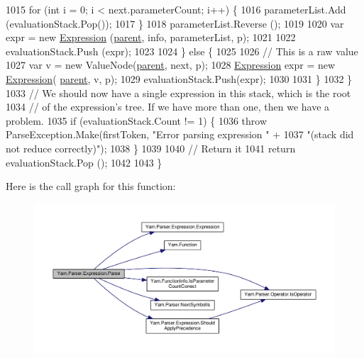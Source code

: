 \begin{DoxyCode}
1015                         \textcolor{keywordflow}{for} (\textcolor{keywordtype}{int} i = 0; i < next.parameterCount; i++) \{
1016                             parameterList.Add (evaluationStack.Pop());
1017                         \}
1018                         parameterList.Reverse ();
1019 
1020                         var expr = \textcolor{keyword}{new} \hyperlink{a00104_a17e5101d02b96d0071e7a0223e4daa3d}{Expression} (\hyperlink{a00148_af313a82103fcc2ff5a177dbb06b92f7b}{parent}, info, parameterList, p);
1021 
1022                         evaluationStack.Push (expr);
1023 
1024                     \} \textcolor{keywordflow}{else} \{
1025 
1026                         \textcolor{comment}{// This is a raw value}
1027                         var v = \textcolor{keyword}{new} ValueNode(\hyperlink{a00148_af313a82103fcc2ff5a177dbb06b92f7b}{parent}, next, p);
1028                         \hyperlink{a00104_a17e5101d02b96d0071e7a0223e4daa3d}{Expression} expr = \textcolor{keyword}{new} \hyperlink{a00104_a17e5101d02b96d0071e7a0223e4daa3d}{Expression}(
      \hyperlink{a00148_af313a82103fcc2ff5a177dbb06b92f7b}{parent}, v, p);
1029                         evaluationStack.Push(expr);
1030 
1031                     \}
1032                 \}
1033                 \textcolor{comment}{// We should now have a single expression in this stack, which is the root}
1034                 \textcolor{comment}{// of the expression's tree. If we have more than one, then we have a problem.}
1035                 \textcolor{keywordflow}{if} (evaluationStack.Count != 1) \{
1036                     \textcolor{keywordflow}{throw} ParseException.Make(firstToken, \textcolor{stringliteral}{"Error parsing expression "} +
1037                         \textcolor{stringliteral}{"(stack did not reduce correctly)"});
1038                 \}
1039 
1040                 \textcolor{comment}{// Return it}
1041                 \textcolor{keywordflow}{return} evaluationStack.Pop ();
1042 
1043             \}
\end{DoxyCode}


Here is the call graph for this function\-:
\nopagebreak
\begin{figure}[H]
\begin{center}
\leavevmode
\includegraphics[width=350pt]{a00104_a686da57aaf67d50d2832f9ee0028a979_cgraph}
\end{center}
\end{figure}


